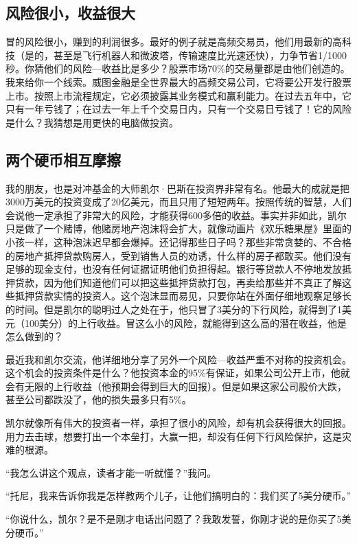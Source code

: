 \subsection{风险很小，收益很大}

冒的风险很小，赚到的利润很多。最好的例子就是高频交易员，他们用最新的高科技（是的，甚至是飞行机器人和微波塔，传输速度比光速还快），力争节省1/1000秒。你猜他们的风险—收益比是多少？股票市场70\%的交易量都是由他们创造的。我来给你一个线索。威图金融是全世界最大的高频交易公司，它将要公开发行股票上市。按照上市流程规定，它必须披露其业务模式和赢利能力。在过去五年中，它只有一年亏钱了；在过去一年上千个交易日内，只有一个交易日亏钱了！它的风险是什么？我猜想是用更快的电脑做投资。

\subsection{两个硬币相互摩擦}

我的朋友，也是对冲基金的大师凯尔·巴斯在投资界非常有名。他最大的成就是把3000万美元的投资变成了20亿美元，而且只用了短短两年。按照传统的智慧，人们会说他一定承担了非常大的风险，才能获得600多倍的收益。事实并非如此，凯尔只是做了一个赌博，他赌房地产泡沫将会扩大，就像动画片《欢乐糖果屋》里面的小孩一样，这种泡沫迟早都会爆掉。还记得那些日子吗？那些非常贪婪的、不合格的房地产抵押贷款购房人，受到销售人员的劝诱，什么样的房子都敢买。他们没有足够的现金支付，也没有任何证据证明他们负担得起。银行等贷款人不停地发放抵押贷款，因为他们知道他们可以把这些抵押贷款打包，再卖给那些并不真正了解这些抵押贷款实情的投资人。这个泡沫显而易见，只要你站在外面仔细地观察足够长的时间。但是凯尔的聪明过人之处在于，他只冒了3美分的下行风险，就得到了1美元（100美分）的上行收益。冒这么小的风险，就能得到这么高的潜在收益，他是怎么做到的？

最近我和凯尔交流，他详细地分享了另外一个风险—收益严重不对称的投资机会。这个机会的投资条件是什么？他投资本金的95\%有保证，如果公司公开上市，他就会有无限的上行收益（他预期会得到巨大的回报）。但是如果这家公司股价大跌，甚至公司都跌没了，他的损失最多只有5\%。

凯尔就像所有伟大的投资者一样，承担了很小的风险，却有机会获得很大的回报。用力去击球，想要打出一个本垒打，大赢一把，却没有任何下行风险保护，这是灾难的根源。

“我怎么讲这个观点，读者才能一听就懂？”我问。

“托尼，我来告诉你我是怎样教两个儿子，让他们搞明白的：我们买了5美分硬币。”

“你说什么，凯尔？是不是刚才电话出问题了？我敢发誓，你刚才说的是你买了5美分硬币。”

